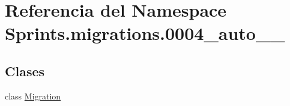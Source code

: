 \hypertarget{namespace_sprints_1_1migrations_1_10004__auto__20160630__1356}{}\section{Referencia del Namespace Sprints.\+migrations.0004\+\_\+auto\+\_\+\_}
\label{namespace_sprints_1_1migrations_1_10004__auto__20160630__1356}
\subsection*{Clases}
\begin{DoxyCompactItemize}
\item 
class \hyperlink{class_sprints_1_1migrations_1_10004__auto__20160630__1356_1_1_migration}{Migration}
\end{DoxyCompactItemize}
